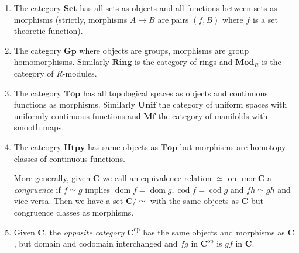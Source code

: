 \documentclass[a4paper]{article}
\renewcommand{\c}[1]{\mathbf{#1}}
\DeclareMathOperator{\mor}{mor}
\DeclareMathOperator{\dom}{dom}
\DeclareMathOperator{\cod}{cod}
\newcommand{\Set}{{\c{Set}}}
\newcommand{\Top}{{\c{Top}}}
\begin{document}
\begin{eg}\leavevmode
  \begin{enumerate}
  \item The category \(\Set\) has all sets as objects and all functions between sets as morphisms (strictly, morphisms \(A \to B\) are pairs \((f, B)\) where \(f\) is a set theoretic function).
  \item The category \(\c{Gp}\) where objects are groups, morphisms are group homomorphisms. Similarly \(\c{Ring}\) is the category of rings and \(\c{Mod}_R\) is the category of \(R\)-modules.
  \item The category \(\Top\) has all topological spaces as objects and continuous functions as morphisms. Similarly \(\c{Unif}\) the category of uniform spaces with uniformly continuous functions and \(\c{Mf}\) the category of manifolds with smooth maps.
  \item The cateogry \(\c{Htpy}\) has same objects as \(\Top\) but morphisms are homotopy classes of continuous functions.

    More generally, given \(\c C\) we call an equivalence relation \(\simeq\) on \(\mor \c C\) a \emph{congruence} if \(f \simeq g\) implies \(\dom f = \dom g, \cod f = \cod g\) and \(fh \simeq gh\) and vice versa.
    Then we have a set \(\c C / \simeq\) with the same objects as \(\c C\) but congruence classes as morphisms.
  \item Given \(\c C\), the \emph{opposite category} \(\c C^{\text{op}}\) has the same objects and morphisms as \(\c C\), but domain and codomain interchanged and \(fg\) in \(\c C^{\text{op}}\) is \(gf\) in \(\c C\).


\end{enumerate}
\end{eg}
\end{document}
